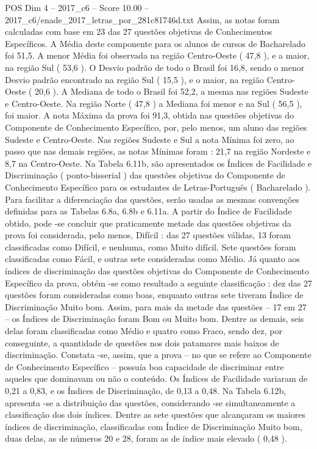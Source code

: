 \begin{textsample}{POS Dim 4 – 2017\_c6 – Score 10.00 – 2017\_c6/enade\_2017\_letras\_por\_281c81746d.txt}
Assim, as notas foram calculadas com base em 23 das 27 questões objetivas de Conhecimentos Específicos.
A Média deste componente para os alunos de cursos de Bacharelado foi 51,5.
A menor Média foi observada na região Centro-Oeste ( 47,8 ), e a maior, na região Sul ( 53,6 ).
O Desvio padrão de todo o Brasil foi 16,8, sendo o menor Desvio padrão encontrado na região Sul ( 15,5 ), e o maior, na região Centro-Oeste ( 20,6 ).
A Mediana de todo o Brasil foi 52,2, a mesma nas regiões Sudeste e Centro-Oeste.
Na região Norte ( 47,8 ) a Mediana foi menor e na Sul ( 56,5 ), foi maior.
A nota Máxima da prova foi 91,3, obtida nas questões objetivas do Componente de Conhecimento Específico, por, pelo menos, um aluno das regiões Sudeste e Centro-Oeste.
Nas regiões Sudeste e Sul a nota Mínima foi zero, ao passo que nas demais regiões, as notas Mínimas foram : 21,7 na região Nordeste e 8,7 na Centro-Oeste.
Na Tabela 6.11b, são apresentados os Índices de Facilidade e Discriminação ( ponto-bisserial ) das questões objetivas do Componente de Conhecimento Específico para os estudantes de Letras-Português ( Bacharelado ).
Para facilitar a diferenciação das questões, serão usadas as mesmas convenções definidas para as Tabelas 6.8a, 6.8b e 6.11a.
A partir do Índice de Facilidade obtido, pode -se concluir que praticamente metade das questões objetivas da prova foi considerada, pelo menos, Difícil : das 27 questões válidas, 13 foram classificadas como Difícil, e nenhuma, como Muito difícil.
Sete questões foram classificadas como Fácil, e outras sete consideradas como Médio.
Já quanto aos índices de discriminação das questões objetivas do Componente de Conhecimento Específico da prova, obtém -se como resultado a seguinte classificação : dez das 27 questões foram consideradas como boas, enquanto outras sete tiveram Índice de Discriminação Muito bom.
Assim, para mais da metade das questões – 17 em 27 – os Índices de Discriminação foram Bom ou Muito bom.
Dentre as demais, seis delas foram classificadas como Médio e quatro como Fraco, sendo dez, por conseguinte, a quantidade de questões nos dois patamares mais baixos de discriminação.
Constata -se, assim, que a prova – no que se refere ao Componente de Conhecimento Específico – possuía boa capacidade de discriminar entre aqueles que dominavam ou não o conteúdo.
Os Índices de Facilidade variaram de 0,21 a 0,83, e os Índices de Discriminação, de 0,13 a 0,48.
Na Tabela 6.12b, apresenta -se a distribuição das questões, considerando -se simultaneamente a classificação dos dois índices.
Dentre as sete questões que alcançaram os maiores índices de discriminação, classificadas com Índice de Discriminação Muito bom, duas delas, as de números 20 e 28, foram as de índice mais elevado ( 0,48 ).

\end{textsample}
